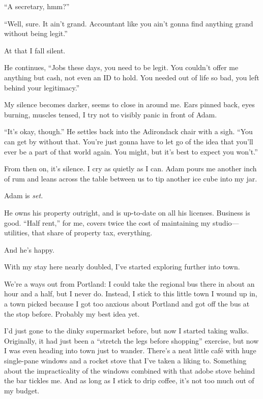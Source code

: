 ``A secretary, hmm?''

``Well, sure. It ain't grand. Accountant like you ain't gonna find anything grand without being legit.''

At that I fall silent.

He continues, ``Jobs these days, you need to be legit. You couldn't offer me anything but cash, not even an ID to hold. You needed out of life so bad, you left behind your legitimacy.''

My silence becomes darker, seems to close in around me. Ears pinned back, eyes burning, muscles tensed, I try not to visibly panic in front of Adam.

``It's okay, though.'' He settles back into the Adirondack chair with a sigh. ``You can get by without that. You're just gonna have to let go of the idea that you'll ever be a part of that world again. You might, but it's best to expect you won't.''

From then on, it's silence. I cry as quietly as I can. Adam pours me another inch of rum and leans across the table between us to tip another ice cube into my jar.

\secdiv{}

\noindent Adam is \emph{set.}

He owns his property outright, and is up-to-date on all his licenses. Business is good. ``Half rent,'' for me, covers twice the cost of maintaining my studio---utilities, that share of property tax, everything.

And he's happy.

\secdiv{}

\noindent With my stay here nearly doubled, I've started exploring further into town.

We're a ways out from Portland: I could take the regional bus there in about an hour and a half, but I never do. Instead, I stick to this little town I wound up in, a town picked because I got too anxious about Portland and got off the bus at the stop before. Probably my best idea yet.

I'd just gone to the dinky supermarket before, but now I started taking walks. Originally, it had just been a ``stretch the legs before shopping'' exercise, but now I was even heading into town just to wander. There's a neat little café with huge single-pane windows and a rocket stove that I've taken a liking to. Something about the impracticality of the windows combined with that adobe stove behind the bar tickles me. And as long as I stick to drip coffee, it's not too much out of my budget.

